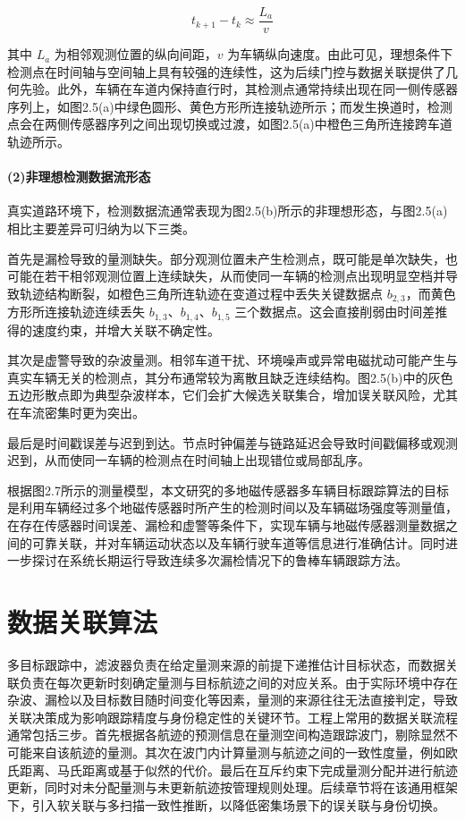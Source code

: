 \documentclass{xdupgthesis}
\begin{document}
\begin{equation}
	t_{k+1}-t_k \approx \frac{L_a}{v}
	\tag{2-7}
\end{equation}

其中 $L_a$ 为相邻观测位置的纵向间距，$v$ 为车辆纵向速度。由此可见，理想条件下检测点在时间轴与空间轴上具有较强的连续性，这为后续门控与数据关联提供了几何先验。此外，车辆在车道内保持直行时，其检测点通常持续出现在同一侧传感器序列上，如图2.5(a)中绿色圆形、黄色方形所连接轨迹所示；而发生换道时，检测点会在两侧传感器序列之间出现切换或过渡，如图2.5(a)中橙色三角所连接跨车道轨迹所示。

\paragraph{(2)非理想检测数据流形态}


真实道路环境下，检测数据流通常表现为图2.5(b)所示的非理想形态，与图2.5(a)相比主要差异可归纳为以下三类。

首先是漏检导致的量测缺失。部分观测位置未产生检测点，既可能是单次缺失，也可能在若干相邻观测位置上连续缺失，从而使同一车辆的检测点出现明显空档并导致轨迹结构断裂，如橙色三角所连轨迹在变道过程中丢失关键数据点 $b_{2,3}$，而黄色方形所连接轨迹连续丢失 $b_{1,3}$、$b_{1,4}$、$b_{1,5}$ 三个数据点。这会直接削弱由时间差推得的速度约束，并增大关联不确定性。

其次是虚警导致的杂波量测。相邻车道干扰、环境噪声或异常电磁扰动可能产生与真实车辆无关的检测点，其分布通常较为离散且缺乏连续结构。图2.5(b)中的灰色五边形散点即为典型杂波样本，它们会扩大候选关联集合，增加误关联风险，尤其在车流密集时更为突出。

最后是时间戳误差与迟到到达。节点时钟偏差与链路延迟会导致时间戳偏移或观测迟到，从而使同一车辆的检测点在时间轴上出现错位或局部乱序。

根据图2.7所示的测量模型，本文研究的多地磁传感器多车辆目标跟踪算法的目标是利用车辆经过多个地磁传感器时所产生的检测时间以及车辆磁场强度等测量值，在存在传感器时间误差、漏检和虚警等条件下，实现车辆与地磁传感器测量数据之间的可靠关联，并对车辆运动状态以及车辆行驶车道等信息进行准确估计。同时进一步探讨在系统长期运行导致连续多次漏检情况下的鲁棒车辆跟踪方法。


\section{数据关联算法}\label{sec:orm}
多目标跟踪中，滤波器负责在给定量测来源的前提下递推估计目标状态，而数据关联负责在每次更新时刻确定量测与目标航迹之间的对应关系。由于实际环境中存在杂波、漏检以及目标数目随时间变化等因素，量测的来源往往无法直接判定，导致关联决策成为影响跟踪精度与身份稳定性的关键环节。工程上常用的数据关联流程通常包括三步。首先根据各航迹的预测信息在量测空间构造跟踪波门，剔除显然不可能来自该航迹的量测。其次在波门内计算量测与航迹之间的一致性度量，例如欧氏距离、马氏距离或基于似然的代价。最后在互斥约束下完成量测分配并进行航迹更新，同时对未分配量测与未更新航迹按管理规则处理。后续章节将在该通用框架下，引入软关联与多扫描一致性推断，以降低密集场景下的误关联与身份切换。
\end{document}
